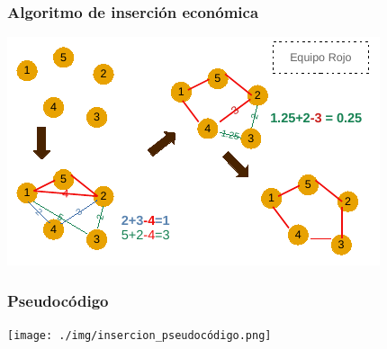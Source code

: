 \documentclass[13pt]{beamer}
\begin{document}
    \begin{frame}
		\frametitle{Algoritmo de inserción económica}
		\begin{center}
			\includegraphics[scale=1.5]{./img/DibInsercion.pdf}
		\end{center}
	\end{frame}

	\begin{frame}
		\frametitle{Pseudocódigo}
		\begin{center}
			\texttt{[image: ./img/insercion\_pseudocódigo.png]}
		\end{center}
	\end{frame}
\end{document}

